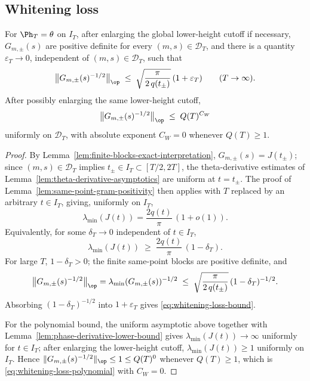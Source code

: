 \subsection{Whitening loss}
\label{subsec:whitening-loss}

\begin{lemma}
\label{lem:whitening-loss}
For \(\Ph_T = \theta\) on \(I_T\), after enlarging the global
lower-height cutoff if necessary, \(G_{m,\pm}(s)\) are positive
definite for every \((m,s)\in\mathcal D_T\), and there is a quantity
\(\varepsilon_T\to 0\), independent of \((m,s)\in\mathcal D_T\), such
that
\begin{equation}
\label{eq:whitening-loss-bound}
        \bigl\|G_{m,\pm}(s)^{-1/2}\bigr\|_{\op}
        \;\le\;
        \sqrt{\frac{\pi}{2\,q(t_\pm)}}\,(1+\varepsilon_T)
        \qquad (T\to\infty).
\end{equation}
After possibly enlarging the same lower-height cutoff,
\begin{equation}
\label{eq:whitening-loss-polynomial}
        \bigl\|G_{m,\pm}(s)^{-1/2}\bigr\|_{\op}
        \;\le\; Q(T)^{C_W}
\end{equation}
uniformly on \(\mathcal D_T\), with absolute exponent \(C_W = 0\)
whenever \(Q(T)\ge 1\).
\end{lemma}

\begin{proof}
By Lemma~\ref{lem:finite-blocks-exact-interpretation},
\(G_{m,\pm}(s) = J(t_\pm)\); since \((m,s)\in\mathcal D_T\) implies
\(t_\pm\in I_T\subset[T/2, 2T]\), the theta-derivative estimates of
Lemma~\ref{lem:theta-derivative-asymptotics} are uniform at
\(t = t_\pm\).  The proof of Lemma~\ref{lem:same-point-gram-positivity}
then applies with \(T\) replaced by an arbitrary \(t\in I_T\), giving,
uniformly on \(I_T\),
\[
        \lambda_{\min}(J(t))
        = \frac{2q(t)}{\pi}\,(1 + o(1)).
\]
Equivalently, for some \(\delta_T\to 0\) independent of \(t\in I_T\),
\[
        \lambda_{\min}(J(t))
        \;\ge\; \frac{2q(t)}{\pi}\,(1-\delta_T).
\]
For large \(T\), \(1-\delta_T > 0\); the finite same-point blocks are
positive definite, and
\[
        \bigl\|G_{m,\pm}(s)^{-1/2}\bigr\|_{\op}
        = \lambda_{\min}(G_{m,\pm}(s))^{-1/2}
        \;\le\; \sqrt{\frac{\pi}{2\,q(t_\pm)}}\,(1-\delta_T)^{-1/2}.
\]
Absorbing \((1-\delta_T)^{-1/2}\) into \(1+\varepsilon_T\) gives
\eqref{eq:whitening-loss-bound}.

For the polynomial bound, the uniform asymptotic above together with
Lemma~\ref{lem:phase-derivative-lower-bound} gives
\(\lambda_{\min}(J(t))\to\infty\) uniformly for \(t\in I_T\); after
enlarging the lower-height cutoff,
\(\lambda_{\min}(J(t))\ge 1\) uniformly on \(I_T\).  Hence
\(\|G_{m,\pm}(s)^{-1/2}\|_{\op}\le 1\le Q(T)^0\) whenever
\(Q(T)\ge 1\), which is \eqref{eq:whitening-loss-polynomial} with
\(C_W = 0\).
\end{proof}

